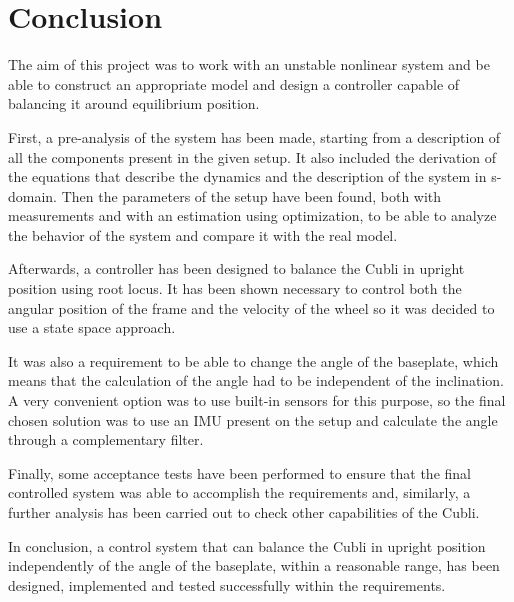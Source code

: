 \chapter{Conclusion}

The aim of this project was to work with an unstable nonlinear system and be able to construct an appropriate model and design a controller capable of balancing it around equilibrium position.

First, a pre-analysis of the system has been made, starting from a description of all the components present in the given setup. It also included the derivation of the equations that describe the dynamics and the description of the system in s-domain. Then the parameters of the setup have been found, both with measurements and with an estimation using optimization, to be able to analyze the behavior of the system and compare it with the real model.

Afterwards, a controller has been designed to balance the Cubli in upright position using root locus. It has been shown necessary to control both the angular position of the frame and the velocity of the wheel so it was decided to use a state space approach.

It was also a requirement to be able to change the angle of the baseplate, which means that the calculation of the angle had to be independent of the inclination. A very convenient option was to use built-in sensors for this purpose, so the final chosen solution was to use an IMU present on the setup and calculate the angle through a complementary filter.

Finally, some acceptance tests have been performed to ensure that the final controlled system was able to accomplish the requirements and, similarly, a further analysis has been carried out to check other capabilities of the Cubli.

In conclusion, a control system that can balance the Cubli in upright position independently of the angle of the baseplate, within a reasonable range, has been designed, implemented and tested successfully within the requirements.

